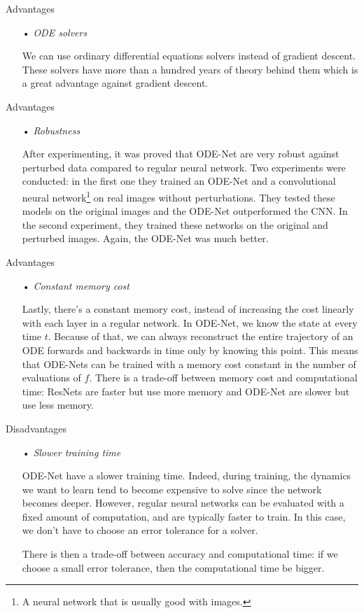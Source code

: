 \documentclass[11pt]{beamer}
\begin{document}
\begin{frame}{Advantages}
\begin{itemize}
\item[•] \textit{ODE solvers}

We can use ordinary differential equations solvers instead of gradient descent. These solvers have more than a hundred years of theory behind them which is a great advantage against gradient descent.
\end{itemize}
\end{frame}

\begin{frame}{Advantages}
\begin{itemize}
\item[•] \textit{Robustness} \cite{4}

After experimenting, it was proved that ODE-Net are very robust against perturbed data compared to regular neural network. Two experiments were conducted: in the first one they trained an ODE-Net and a convolutional neural network\footnote{A neural network that is usually good with images.} on real images without perturbations. They tested these models on the original images and the ODE-Net outperformed the CNN. In the second experiment, they trained these networks on the original and perturbed images. Again, the ODE-Net was much better.
\end{itemize}
\end{frame}

\begin{frame}{Advantages}
\begin{itemize}
\item[•] \textit{Constant memory cost}

Lastly, there's a constant memory cost, instead of increasing the cost linearly with each layer in a regular network. 
In ODE-Net, we know the state at every time $t$. Because of that, we can always reconstruct the entire trajectory of an ODE forwards and backwards in time only by knowing this point. This means that ODE-Nets can be trained with a memory cost constant in the number of evaluations of $f$.
There is a trade-off between memory cost and computational time: ResNets are faster but use more memory and ODE-Net are slower but use less memory.
\end{itemize}
\end{frame}

\begin{frame}{Disadvantages}
\begin{itemize}
\item[•] \textit{Slower training time}

ODE-Net have a slower training time. Indeed, during training, the dynamics we want to learn tend to become expensive to solve since the network becomes deeper. However, regular neural networks can be evaluated with a fixed amount of computation, and are typically faster to train. In this case, we don't have to choose an error tolerance for a solver.

There is then a trade-off between accuracy and computational time: if we choose a small error tolerance, then the computational time be bigger.
\end{itemize}
\end{frame}
\end{document}
